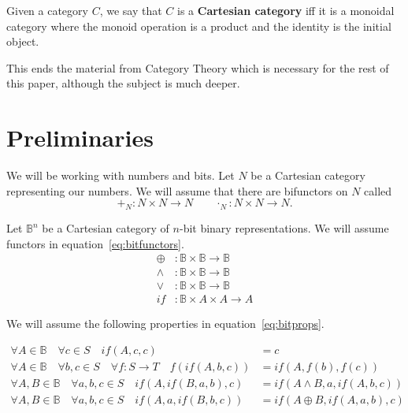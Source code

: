 \documentclass[14pt]{extarticle}  %
\newcommand{\atticus}[1]{\textbf{AK: #1}}
\begin{document}
\begin{defn}
\begin{defn}
  Given a category $C$, we say that $C$ is a \textbf{Cartesian category} iff it is a monoidal category where the monoid operation is a product and the identity is the initial object.
\end{defn}

This ends the material from Category Theory which is necessary for the rest of this paper, although the subject is much deeper.


\end{defn}
\section{Preliminaries}
We will be working with numbers and bits.
Let $N$ be a Cartesian category representing our numbers. We will assume that there are bifunctors on $N$ called
\[+_{N} : N \times N \to N \qquad \cdot_{N} : N \times N \to N.\]

Let $\mathbb{B}^{n}$ be a Cartesian category of $n$-bit binary representations. We will assume functors in equation~\ref{eq:bitfunctors}.
\begin{align}\label{eq:bitfunctors}
  \oplus &: \mathbb{B} \times \mathbb{B} \to \mathbb{B} \\
  \land &: \mathbb{B} \times \mathbb{B} \to \mathbb{B} \\
  \lor &: \mathbb{B} \times \mathbb{B} \to \mathbb{B} \\
  if &: \mathbb{B} \times A \times A \to A
\end{align}

We will assume the following properties in equation~\ref{eq:bitprops}. %

\begin{align}\label{eq:bitprops}
  \forall A \in \mathbb{B} \quad \forall c \in S \quad if(A,c,c)  &= c \\
  \forall A \in \mathbb{B} \quad \forall b,c \in S \quad \forall f : S \to T \quad  f(if(A,b,c)) &= if(A,f(b), f(c)) \\
  \forall A, B \in \mathbb{B} \quad \forall a,b,c \in S \quad if(A, if(B, a,b),c) &= if(A \land B, a, if(A, b,c)) \\
  \forall A, B \in \mathbb{B} \quad \forall a,b,c \in S \quad if(A, a, if(B,b,c)) &= if(A \oplus B, if(A , a , b), c )
\end{align}

\end{document}
